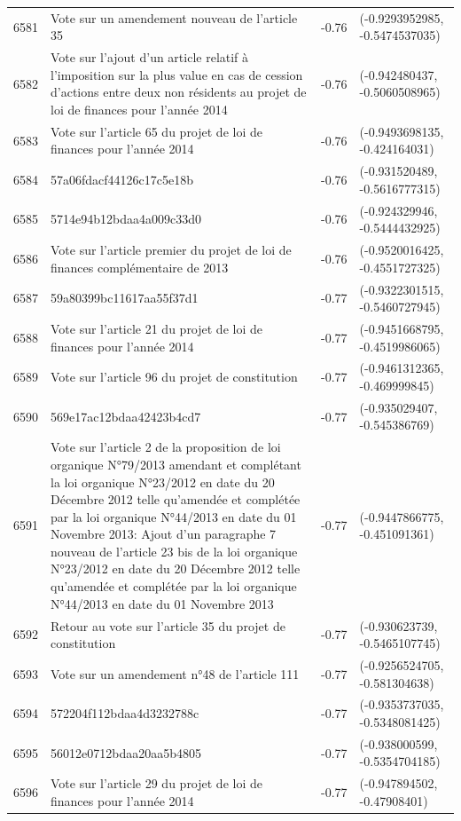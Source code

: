 \begin{table}[ht]
\begin{tabular}{rlrl}
  6581 & Vote sur un amendement nouveau de l'article 35 & -0.76 & (-0.9293952985, -0.5474537035) \\ 
  6582 & Vote sur l'ajout d'un article relatif à l'imposition sur la plus value en cas de cession d'actions entre deux non résidents au projet de loi de finances pour l'année 2014 & -0.76 & (-0.942480437, -0.5060508965) \\ 
  6583 & Vote sur l'article 65 du projet de loi de finances pour l'année 2014 & -0.76 & (-0.9493698135, -0.424164031) \\ 
  6584 & 57a06fdacf44126c17c5e18b & -0.76 & (-0.931520489, -0.5616777315) \\ 
  6585 & 5714e94b12bdaa4a009c33d0 & -0.76 & (-0.924329946, -0.5444432925) \\ 
  6586 & Vote sur l'article premier du projet de loi de finances complémentaire de 2013 & -0.76 & (-0.9520016425, -0.4551727325) \\ 
  6587 & 59a80399bc11617aa55f37d1 & -0.77 & (-0.9322301515, -0.5460727945) \\ 
  6588 & Vote sur l'article 21 du projet de loi de finances pour l'année 2014 & -0.77 & (-0.9451668795, -0.4519986065) \\ 
  6589 & Vote sur l'article 96 du projet de constitution & -0.77 & (-0.9461312365, -0.469999845) \\ 
  6590 & 569e17ac12bdaa42423b4cd7 & -0.77 & (-0.935029407, -0.545386769) \\ 
  6591 & Vote sur l'article 2 de la proposition de loi organique N°79/2013 amendant et complétant la loi organique N°23/2012 en date du 20 Décembre 2012 telle qu'amendée et complétée par la loi organique N°44/2013 en date du 01 Novembre 2013: Ajout d'un paragraphe 7 nouveau de l'article 23 bis de la loi organique N°23/2012 en date du 20 Décembre 2012 telle qu'amendée et complétée par la loi organique N°44/2013 en date du 01 Novembre 2013 & -0.77 & (-0.9447866775, -0.451091361) \\ 
  6592 & Retour au vote sur l'article 35 du projet de constitution & -0.77 & (-0.930623739, -0.5465107745) \\ 
  6593 & Vote sur un amendement n°48 de l'article 111 & -0.77 & (-0.9256524705, -0.581304638) \\ 
  6594 & 572204f112bdaa4d3232788c & -0.77 & (-0.9353737035, -0.5348081425) \\ 
  6595 & 56012e0712bdaa20aa5b4805 & -0.77 & (-0.938000599, -0.5354704185) \\ 
  6596 & Vote sur l'article 29 du projet de loi de finances pour l'année 2014 & -0.77 & (-0.947894502, -0.47908401) \\ 

\end{tabular}
\end{table}
